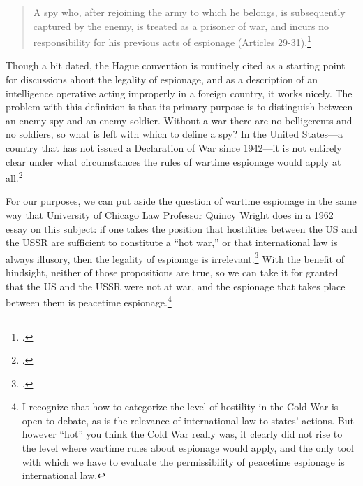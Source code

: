 \documentclass[11pt]{memoir}
\begin{document}
\begin{refsegment}
\begin{quote}
A spy who, after rejoining the army to which he belongs, is subsequently captured by the enemy, is treated as a prisoner of war, and incurs no responsibility for his previous acts of espionage (Articles 29-31).\footcite{noauthor_hague_1907} \\
\end{quote}
Though a bit dated, the Hague convention is routinely cited as a starting point for discussions about the legality of espionage, and as a description of an intelligence operative acting improperly in a foreign country, it works nicely. The problem with this definition is that its primary purpose is to distinguish between an enemy spy and an enemy soldier. Without a war there are no belligerents and no soldiers, so what is left with which to define a spy? In the United States---a country that has not issued a Declaration of War since 1942---it is not entirely clear under what circumstances the rules of wartime espionage would apply at all.\footcite{ncc_staff_when_2018}


For our purposes, we can put aside the question of wartime espionage in the same way that University of Chicago Law Professor Quincy Wright does in a 1962 essay on this subject: if one takes the position that hostilities between the US and the USSR are sufficient to constitute a ``hot war,'' or that international law is always illusory, then the legality of espionage is irrelevant.\footcite[p.~8]{wright_espionage_1962} With the benefit of hindsight, neither of those propositions are true, so we can take it for granted that the US and the USSR were not at war, and the espionage that takes place between them is peacetime espionage.\footnote{I recognize that how to categorize the level of hostility in the Cold War is open to debate, as is the relevance of international law to states' actions. But however ``hot'' you think the Cold War really was, it clearly did not rise to the level where wartime rules about espionage would apply, and the only tool with which we have to evaluate the permissibility of peacetime espionage is international law.}


\end{refsegment}
\end{document}
